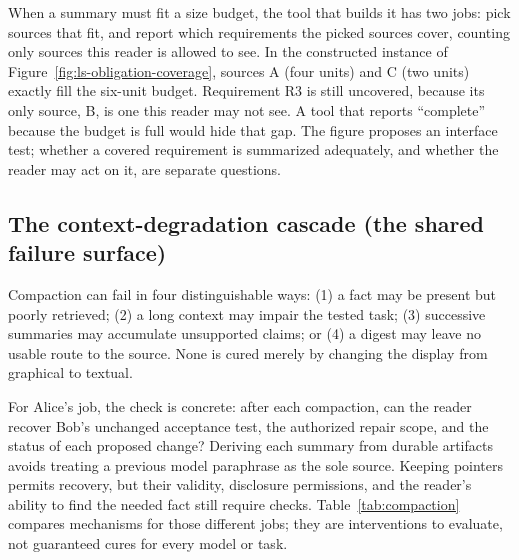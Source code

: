 \documentclass[11pt,a4paper]{article}
\theoremstyle{definition}
\theoremstyle{plain}
\begin{document}
When a summary must fit a size budget, the tool that builds it has two jobs:
pick sources that fit, and report which requirements the picked sources cover,
counting only sources this reader is allowed to see. In the constructed
instance of Figure~\ref{fig:ls-obligation-coverage}, sources A (four units) and
C (two units) exactly fill the six-unit budget. Requirement R3 is still
uncovered, because its only source, B, is one this reader may not see. A tool
that reports ``complete'' because the budget is full would hide that gap. The
figure proposes an interface test; whether a covered requirement is summarized
adequately, and whether the reader may act on it, are separate questions.


\subsection{The context-degradation cascade (the shared failure surface)}\label{sec:cascade}

Compaction can fail in four distinguishable ways: (1) a fact may be present but
poorly retrieved; (2) a long context may impair the tested task; (3) successive summaries
may accumulate unsupported claims; or (4) a digest may leave no usable route to the
source. None is cured merely by changing the display from graphical to textual.

For Alice's job, the check is concrete: after each compaction, can the reader
recover Bob's unchanged acceptance test, the authorized repair scope, and the
status of each proposed change? Deriving each summary from durable artifacts
avoids treating a previous model paraphrase as the sole source. Keeping pointers
permits recovery, but their validity, disclosure permissions, and the reader's
ability to find the needed fact still require checks. Table~\ref{tab:compaction}
compares mechanisms for those different jobs; they are interventions to evaluate,
not guaranteed cures for every model or task.
\end{document}
